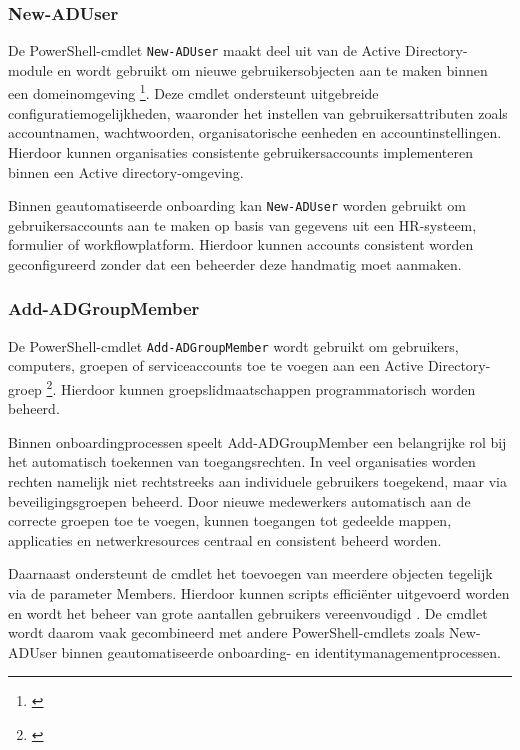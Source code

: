 \subsubsection{New-ADUser}

De PowerShell-cmdlet \texttt{New-ADUser} maakt deel uit van de Active Directory-module en wordt gebruikt om nieuwe gebruikersobjecten aan te maken binnen een domeinomgeving \footnote{\autocite{Microsoft2024a}}. Deze cmdlet ondersteunt uitgebreide configuratiemogelijkheden, waaronder het instellen van gebruikersattributen zoals accountnamen, wachtwoorden, organisatorische eenheden en accountinstellingen. Hierdoor kunnen organisaties consistente gebruikersaccounts implementeren binnen een Active di\-rec\-to\-ry-omgeving.

Binnen geautomatiseerde onboarding kan \texttt{New-ADUser} worden gebruikt om gebruikersaccounts aan te maken op basis van gegevens uit een HR-systeem, formulier of workflowplatform. Hierdoor kunnen accounts consistent worden geconfigureerd zonder dat een beheerder deze handmatig moet aanmaken.

\subsubsection{Add-ADGroupMember}

De PowerShell-cmdlet \texttt{Add-ADGroupMember} wordt gebruikt om gebruikers, computers, groepen of serviceaccounts toe te voegen aan een Active Directory-groep \footnote{\autocite{Microsoft2025a}}. Hierdoor kunnen groepslidmaatschappen programmatorisch worden beheerd.

Binnen onboardingprocessen speelt Add-ADGroupMember een belangrijke rol bij het automatisch toekennen van toegangsrechten. In veel organisaties worden rechten namelijk niet rechtstreeks aan individuele gebruikers toegekend, maar via beveiligingsgroepen beheerd. Door nieuwe medewerkers automatisch aan de correcte groepen toe te voegen, kunnen toegangen tot gedeelde mappen, applicaties en netwerkresources centraal en consistent beheerd worden.

Daarnaast ondersteunt de cmdlet het toevoegen van meerdere objecten tegelijk via de parameter Members. Hierdoor kunnen scripts efficiënter uitgevoerd worden en wordt het beheer van grote aantallen gebruikers vereenvoudigd \autocite{Microsoft2025a}. De cmdlet wordt daarom vaak gecombineerd met andere PowerShell-cmdlets zoals New-ADUser binnen geautomatiseerde onboarding- en identitymanagementprocessen.

